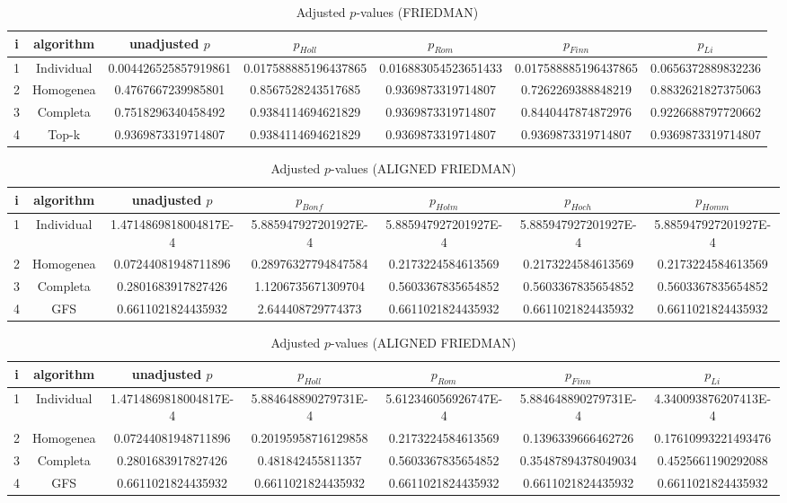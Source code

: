\documentclass[a4paper,10pt]{article}
\begin{document}
\begin{landscape}
\begin{table}[!htp]
\centering\scriptsize
\caption{Adjusted $p$-values (FRIEDMAN)}
\begin{tabular}{ccccccc}
i&algorithm&unadjusted $p$&$p_{Holl}$&$p_{Rom}$&$p_{Finn}$&$p_{Li}$\\
\hline
1&Individual&0.004426525857919861&0.017588885196437865&0.016883054523651433&0.017588885196437865&0.0656372889832236\\
2&Homogenea&0.4767667239985801&0.8567528243517685&0.9369873319714807&0.7262269388848219&0.8832621827375063\\
3&Completa&0.7518296340458492&0.9384114694621829&0.9369873319714807&0.8440447874872976&0.9226688797720662\\
4&Top-k&0.9369873319714807&0.9384114694621829&0.9369873319714807&0.9369873319714807&0.9369873319714807\\
\hline
\end{tabular}
\end{table}


\newpage

\begin{table}[!htp]
\centering\scriptsize
\caption{Adjusted $p$-values (ALIGNED FRIEDMAN)}
\begin{tabular}{ccccccc}
i&algorithm&unadjusted $p$&$p_{Bonf}$&$p_{Holm}$&$p_{Hoch}$&$p_{Homm}$\\
\hline
1&Individual&1.4714869818004817E-4&5.885947927201927E-4&5.885947927201927E-4&5.885947927201927E-4&5.885947927201927E-4\\
2&Homogenea&0.07244081948711896&0.28976327794847584&0.2173224584613569&0.2173224584613569&0.2173224584613569\\
3&Completa&0.2801683917827426&1.1206735671309704&0.5603367835654852&0.5603367835654852&0.5603367835654852\\
4&GFS&0.6611021824435932&2.644408729774373&0.6611021824435932&0.6611021824435932&0.6611021824435932\\
\hline
\end{tabular}
\end{table}

\begin{table}[!htp]
\centering\scriptsize
\caption{Adjusted $p$-values (ALIGNED FRIEDMAN)}
\begin{tabular}{ccccccc}
i&algorithm&unadjusted $p$&$p_{Holl}$&$p_{Rom}$&$p_{Finn}$&$p_{Li}$\\
\hline
1&Individual&1.4714869818004817E-4&5.884648890279731E-4&5.612346056926747E-4&5.884648890279731E-4&4.340093876207413E-4\\
2&Homogenea&0.07244081948711896&0.20195958716129858&0.2173224584613569&0.1396339666462726&0.17610993221493476\\
3&Completa&0.2801683917827426&0.481842455811357&0.5603367835654852&0.35487894378049034&0.4525661190292088\\
4&GFS&0.6611021824435932&0.6611021824435932&0.6611021824435932&0.6611021824435932&0.6611021824435932\\
\hline
\end{tabular}
\end{table}



\end{landscape}
\end{document}
